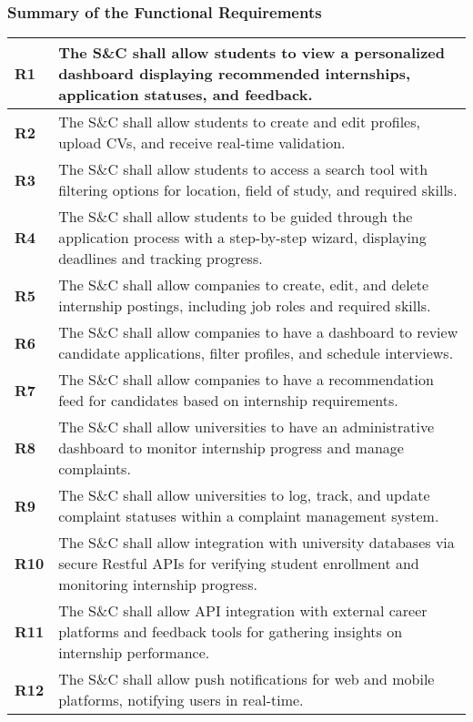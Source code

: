 \subsubsection{Summary of the Functional Requirements}
\begin{longtable}{|p{}|p{}|}
\hline
\textbf{R1} & The S\&C shall allow students to view a personalized dashboard displaying recommended internships, application statuses, and feedback. \\ 
\hline
\textbf{R2} & The S\&C shall allow students to create and edit profiles, upload CVs, and receive real-time validation. \\ 
\hline
\textbf{R3} &The S\&C shall allow students to access a search tool with filtering options for location, field of study, and required skills. \\ 
\hline
\textbf{R4} & The S\&C shall allow students to be guided through the application process with a step-by-step wizard, displaying deadlines and tracking progress. \\ 
\hline
\textbf{R5} & The S\&C shall allow companies to create, edit, and delete internship postings, including job roles and required skills. \\ 
\hline
\textbf{R6} & The S\&C shall allow companies to have a dashboard to review candidate applications, filter profiles, and schedule interviews. \\ 
\hline
\textbf{R7} & The S\&C shall allow companies to have a recommendation feed for candidates based on internship requirements. \\ 
\hline
\textbf{R8} & The S\&C shall allow universities to have an administrative dashboard to monitor internship progress and manage complaints. \\ 
\hline
\textbf{R9} & The S\&C shall allow universities to log, track, and update complaint statuses within a complaint management system. \\ 
\hline
\textbf{R10} & The S\&C shall allow integration with university databases via secure Restful APIs for verifying student enrollment and monitoring internship progress. \\ 
\hline
\textbf{R11} & The S\&C shall allow API integration with external career platforms and feedback tools for gathering insights on internship performance. \\ 
\hline
\textbf{R12} & The S\&C shall allow push notifications for web and mobile platforms, notifying users in real-time. \\ 
\hline

\end{longtable}
